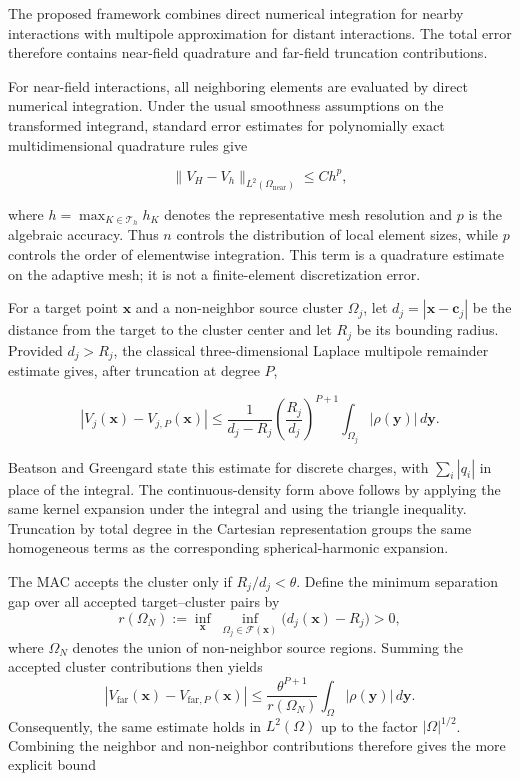 \documentclass[a4paper,10pt]{article}
\begin{document}
The proposed framework combines direct numerical integration for nearby
interactions with multipole approximation for distant interactions.
The total error therefore contains near-field quadrature and far-field
truncation contributions.

For near-field interactions, all neighboring elements are evaluated by
direct numerical integration.  Under the usual smoothness assumptions on
the transformed integrand, standard error estimates for polynomially exact
multidimensional quadrature rules \cite{Stroud1971,DavisRabinowitz1984}
give

\[
\lVert V_H - V_h\rVert_{L^2(\Omega_{\mathrm{near}})}
\le C h^p,
\]

where \(h=\max_{K\in\mathcal T_h}h_K\) denotes the representative mesh
resolution and \(p\) is the algebraic accuracy.  Thus \(n\) controls the
distribution of local element sizes, while \(p\) controls the order of
elementwise integration.  This term is a quadrature estimate on the
adaptive mesh; it is not a finite-element discretization error.

For a target point \(\mathbf x\) and a non-neighbor source cluster
\(\Omega_j\), let \(d_j=|\mathbf x-\mathbf c_j|\) be the distance from
the target to the cluster center and let \(R_j\) be its bounding radius.
Provided \(d_j>R_j\), the classical three-dimensional Laplace multipole
remainder estimate \cite{BeatsonGreengard1997} gives, after truncation at
degree \(P\),

\[
\left|V_j(\mathbf x)-V_{j,P}(\mathbf x)\right|
\leq
\frac{1}{d_j-R_j}
\left(\frac{R_j}{d_j}\right)^{P+1}
\int_{\Omega_j}|\rho(\mathbf y)|\,d\mathbf y.
\]

Beatson and Greengard state this estimate for discrete charges, with
\(\sum_i|q_i|\) in place of the integral.  The continuous-density form
above follows by applying the same kernel expansion under the integral and
using the triangle inequality.  Truncation by total degree in the Cartesian
representation groups the same homogeneous terms as the corresponding
spherical-harmonic expansion.

The MAC accepts the cluster only if \(R_j/d_j<\theta\).  Define the
minimum separation gap over all accepted target--cluster pairs by
\[
r(\Omega_N)
:=
\inf_{\mathbf x}\;
\inf_{\Omega_j\in\mathcal F(\mathbf x)}
\bigl(d_j(\mathbf x)-R_j\bigr)>0,
\]
where \(\Omega_N\) denotes the union of non-neighbor source regions.
Summing the accepted cluster contributions then yields
\[
\left|V_{\mathrm{far}}(\mathbf x)-V_{\mathrm{far},P}(\mathbf x)\right|
\leq
\frac{\theta^{P+1}}{r(\Omega_N)}
\int_{\Omega}|\rho(\mathbf y)|\,d\mathbf y.
\]
Consequently, the same estimate holds in \(L^2(\Omega)\) up to the
factor \(|\Omega|^{1/2}\).  Combining the neighbor and non-neighbor
contributions therefore gives the more explicit bound
\end{document}
